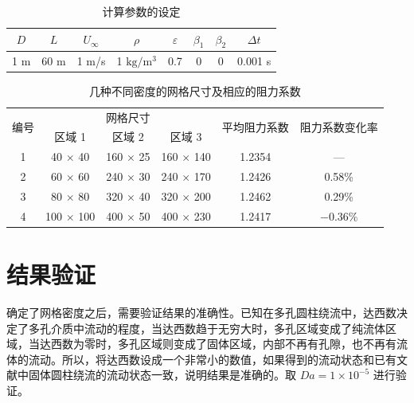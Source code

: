 \begin{table}[ht]
	\caption{计算参数的设定}\label{tab: parameters}
	\vspace{.5em}\centering\wuhao
	\begin{tabular}{*{8}{c}}
		\toprule[1.5pt]
		$D$ & $L$ & $U_{\infty}$ & $\rho$ & $\varepsilon$ & $\beta_1$ & $\beta_2$ & $\Delta t$\\
		\midrule[1pt]
		1 m & 60 m & 1 m/s & 1 $\mathrm{kg}/\mathrm{m}^3$ & 0.7 & 0 & 0 & 0.001 s\\
		\bottomrule[1.5pt]
	\end{tabular}
\end{table}

\begin{table}[ht]
	\caption{几种不同密度的网格尺寸及相应的阻力系数}\label{tab: grid}
	\vspace{.5em}\centering\wuhao
	\begin{tabular}{cccccc}
		\toprule[1.5pt]
		\multirow{2}[3]{*}{编号} & \multicolumn{3}{c}{网格尺寸} & \multirow{2}[3]{*}{平均阻力系数} & \multirow{2}[3]{*}{阻力系数变化率} \\
		\cmidrule[.67pt](lr){2-4}
		& 区域 1 & 区域 2 & 区域 3 & & \\
		\midrule[1pt]
		1 & 40 $\times$ 40 & 160 $\times$ 25 & 160 $\times$ 140 & 1.2354 & — \\
		2 & 60 $\times$ 60 & 240 $\times$ 30 & 240 $\times$ 170 & 1.2426 & 0.58\% \\
		3 & 80 $\times$ 80 & 320 $\times$ 40 & 320 $\times$ 200 & 1.2462 & 0.29\% \\
		4 & 100 $\times$ 100 & 400 $\times$ 50 & 400 $\times$ 230 & 1.2417 & $-0.36\%$ \\
		\bottomrule[1.5pt]
	\end{tabular}
\end{table}

\section{结果验证}\label{sec: result validation}

确定了网格密度之后，需要验证结果的准确性。已知在多孔圆柱绕流中，达西数决定了多孔介质中流动的程度，当达西数趋于无穷大时，多孔区域变成了纯流体区域，当达西数为零时，多孔区域则变成了固体区域，内部不再有孔隙，也不再有流体的流动。所以，将达西数设成一个非常小的数值，如果得到的流动状态和已有文献中固体圆柱绕流的流动状态一致，说明结果是准确的。取 $Da=1\times 10^{-5}$ 进行验证。

